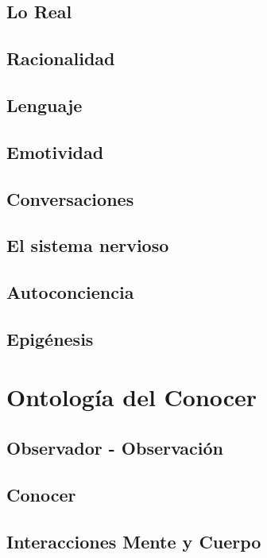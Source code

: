 \documentclass[10pt]{article}
\begin{document}
        \subsection{Lo Real}

        \subsection{Racionalidad}

        \subsection{Lenguaje}

        \subsection{Emotividad}

        \subsection{Conversaciones}

        \subsection{El sistema nervioso}

        \subsection{Autoconciencia}

        \subsection{Epigénesis}

    \section{Ontología del Conocer}

        \subsection{Observador - Observación}

        \subsection{Conocer}

        \subsection{Interacciones Mente y Cuerpo}
\end{document}
